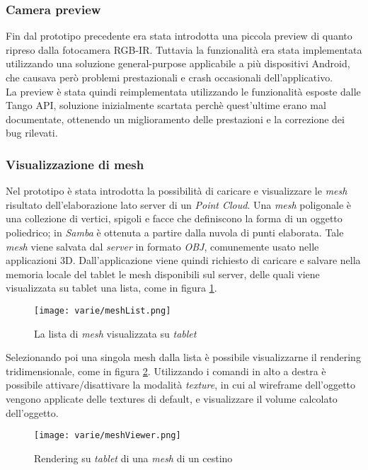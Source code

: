 \subsubsection{Camera preview}
Fin dal prototipo precedente era stata introdotta una piccola preview di quanto ripreso dalla fotocamera RGB-IR. Tuttavia la funzionalità era stata implementata utilizzando una soluzione general-purpose applicabile a più dispositivi Android, che causava però problemi prestazionali e crash occasionali dell'applicativo. \\
La preview è stata quindi reimplementata utilizzando le funzionalità esposte dalle Tango API, soluzione inizialmente scartata perchè quest'ultime erano mal documentate, ottenendo un miglioramento delle prestazioni e la correzione dei bug rilevati.

\subsubsection{Visualizzazione di mesh}
Nel prototipo è stata introdotta la possibilità di caricare e visualizzare le \emph{mesh} risultato dell'elaborazione lato server di un \emph{Point Cloud}.
Una \emph{mesh} poligonale è una collezione di vertici, spigoli e facce che definiscono la forma di un oggetto poliedrico; in \emph{Samba} è ottenuta a partire dalla nuvola di punti elaborata.
Tale \emph{mesh} viene salvata dal \emph{server} in formato \emph{OBJ}, comunemente usato nelle applicazioni 3D. Dall'applicazione viene quindi richiesto di caricare e salvare nella memoria locale del tablet le mesh disponibili sul server, delle quali viene visualizzata su tablet una lista, come in figura \ref{fig:meshListView}.
\begin{figure}[!h] 
    \centering 
    \texttt{[image: varie/meshList.png]} 
    \caption{La lista di \emph{mesh} visualizzata su \emph{tablet}}
   \label{fig:meshListView}
\end{figure}
\newline
Selezionando poi una singola mesh dalla lista è possibile visualizzarne il rendering tridimensionale, come in figura \ref{fig:meshViewer}. Utilizzando i comandi in alto a destra è possibile attivare/disattivare la modalità \emph{texture}, in cui al wireframe dell'oggetto vengono applicate delle textures di default, e visualizzare il volume calcolato dell'oggetto.
\begin{figure}[!h] 
    \centering 
    \texttt{[image: varie/meshViewer.png]} 
    \caption{Rendering su \emph{tablet} di una \emph{mesh} di un cestino}
   \label{fig:meshViewer}
\end{figure}
\newline

